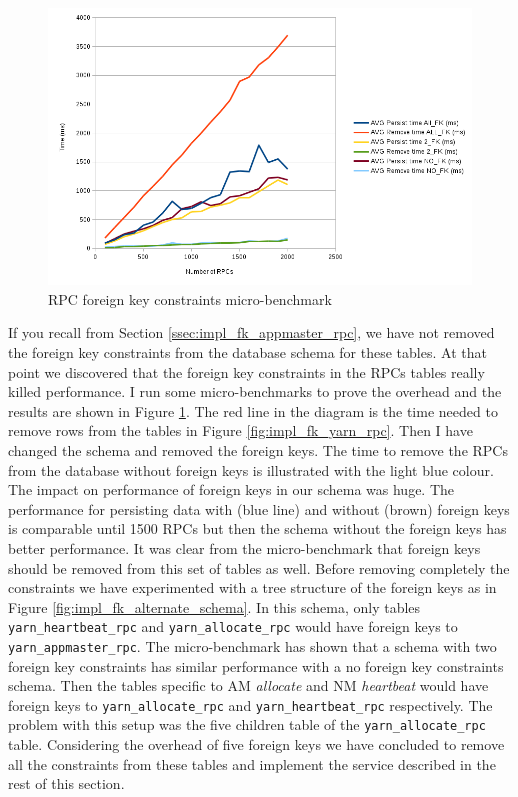 \begin{figure}
\centering
\includegraphics[scale=0.7]{resources/images/Implementation/rpc_fk_overhead.png}
\caption{RPC foreign key constraints micro-benchmark}
\label{fig:impl_fk_overhead}
\end{figure}

If you recall from Section \ref{ssec:impl_fk_appmaster_rpc}, we have
not removed the foreign key constraints from the database schema for
these tables. At that point we discovered that the foreign
key constraints in the RPCs tables really killed performance. I run
some micro-benchmarks to prove the overhead and the results are shown in
Figure \ref{fig:impl_fk_overhead}. The red line in the diagram is the
time needed to remove rows from the tables in Figure
\ref{fig:impl_fk_yarn_rpc}. Then I have changed the schema and removed
the foreign keys. The time to remove the RPCs from the database
without foreign keys is illustrated with the light blue colour. The impact
on performance of foreign keys in our schema was huge. The performance
for persisting data with (blue line) and without (brown) foreign keys
is comparable until 1500 RPCs but then the schema without the foreign
keys has better performance. It was clear from the micro-benchmark that
foreign keys should be removed from this set of tables as well. Before
removing completely the constraints we have experimented with a tree
structure of the foreign keys as in Figure
\ref{fig:impl_fk_alternate_schema}. In this schema, only tables
\texttt{yarn\_heartbeat\_rpc} and \texttt{yarn\_allocate\_rpc} would
have foreign keys to \texttt{yarn\_appmaster\_rpc}. The
micro-benchmark has shown that a schema with two foreign key
constraints has similar performance with a no foreign key constraints
schema. Then the tables specific to AM \emph{allocate} and NM
\emph{heartbeat} would have foreign keys to
\texttt{yarn\_allocate\_rpc} and \texttt{yarn\_heartbeat\_rpc}
respectively. The problem with this setup was the five children table
of the \texttt{yarn\_allocate\_rpc} table. Considering the overhead of
five foreign keys we have concluded
to remove all the constraints from these tables and implement the
service described in the rest of this section.

